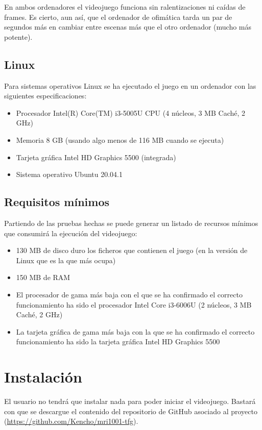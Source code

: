 En ambos ordenadores el videojuego funciona sin ralentizaciones ni caídas de frames. Es cierto, aun así, que el ordenador de ofimática tarda un par de segundos más en cambiar entre escenas más que el otro ordenador (mucho más potente).

\subsection{Linux}
Para sistemas operativos Linux se ha ejecutado el juego en un ordenador con las siguientes especificaciones:
\begin{itemize}
\item
Procesador Intel(R) Core(TM) i3-5005U CPU (4 núcleos, 3 MB Caché, 2 GHz)
\item
Memoria 8 GB (usando algo menos de 116 MB cuando se ejecuta)
\item
Tarjeta gráfica Intel HD Graphics 5500 (integrada)
\item
Sistema operativo Ubuntu 20.04.1
\end{itemize}

\subsection{Requisitos mínimos}
Partiendo de las pruebas hechas se puede generar un listado de recursos mínimos que consumirá la ejecución del videojuego:
\begin{itemize}
\item
130 MB de disco duro los ficheros que contienen el juego (en la versión de Linux que es la que más ocupa)
\item
150 MB de RAM
\item
El procesador de gama más baja con el que se ha confirmado el correcto funcionamiento ha sido el procesador Intel Core i3-6006U (2 núcleos, 3 MB Caché, 2 GHz)
\item
La tarjeta gráfica de gama más baja con la que se ha confirmado el correcto funcionamiento ha sido la tarjeta gráfica Intel HD Graphics 5500
\end{itemize}

\section{Instalación}
El usuario no tendrá que instalar nada para poder iniciar el videojuego. Bastará con que se descargue el contenido del repositorio de GitHub asociado al proyecto (\url{https://github.com/Kencho/mri1001-tfg}).

